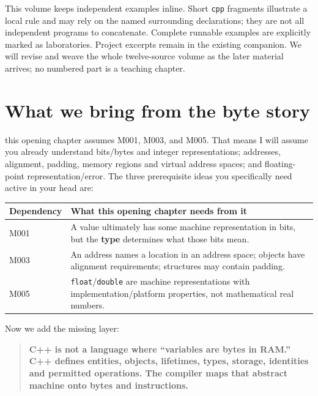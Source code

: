 This volume keeps independent examples inline. Short \texttt{cpp} fragments illustrate a local rule and may rely on the named surrounding declarations; they are not all independent programs to concatenate. Complete runnable examples are explicitly marked as laboratories. Project excerpts remain in the existing companion. We will revise and weave the whole twelve-source volume as the later material arrives; no numbered part is a teaching chapter.

\section{What we bring from the byte story}\label{05-engine-i-ch002-what-we-bring-from-the-byte-story}

this opening chapter assumes M001, M003, and M005. That means I will assume you already understand bits/bytes and integer representations; addresses, alignment, padding, memory regions and virtual address spaces; and floating-point representation/error. The three prerequisite ideas you specifically need active in your head are:

{\def\LTcaptype{none} %
\begin{longtable}[]{@{}
  >{\raggedright\arraybackslash}p{}
  >{\raggedright\arraybackslash}p{}@{}}
\toprule\noalign{}
\begin{minipage}[b]{\linewidth}\raggedright
Dependency
\end{minipage} & \begin{minipage}[b]{\linewidth}\raggedright
What this opening chapter needs from it
\end{minipage} \\
\midrule\noalign{}
\endhead
\bottomrule\noalign{}
\endlastfoot
M001 & A value ultimately has some machine representation in bits, but the \textbf{type} determines what those bits mean. \\
M003 & An address names a location in an address space; objects have alignment requirements; structures may contain padding. \\
M005 & \texttt{float}/\texttt{double} are machine representations with implementation/platform properties, not mathematical real numbers. \\
\end{longtable}
}

Now we add the missing layer:

\begin{quote}
\textbf{C++ is not a language where ``variables are bytes in RAM.'' C++ defines entities, objects, lifetimes, types, storage, identities and permitted operations. The compiler maps that abstract machine onto bytes and instructions.}
\end{quote}

